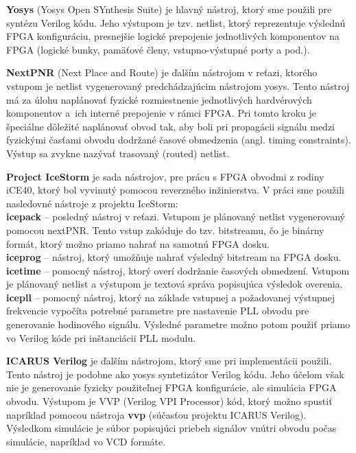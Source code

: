 \textbf{Yosys} (Yosys Open SYnthesis Suite) \cite{yosys} je hlavný nástroj, ktorý sme použili pre syntézu Verilog kódu. Jeho výstupom je tzv. netlist, ktorý reprezentuje výslednú FPGA konfiguráciu, presnejšie logické prepojenie jednotlivých komponentov na FPGA (logické bunky, pamäťové členy, vstupno-výstupné porty a pod.).

\textbf{NextPNR} (Next Place and Route) \cite{nextpnr} je ďalším nástrojom v reťazi, ktorého vstupom je netlist vygenerovaný predchádzajúcim nástrojom yosys. Tento nástroj má za úlohu naplánovať fyzické rozmiestnenie jednotlivých hardvérových komponentov a~ich interné prepojenie v rámci FPGA. Pri tomto kroku je špeciálne dôležité naplánovať obvod tak, aby boli pri propagácii signálu medzi fyzickými časťami obvodu dodržané časové obmedzenia (angl. timing constraints). Výstup sa zvykne nazývať trasovaný (routed) netlist.

\textbf{Project IceStorm} \cite{icestorm} je sada nástrojov, pre prácu s FPGA obvodmi z rodiny iCE40, ktorý bol vyvinutý pomocou reverzného inžinierstva. V práci sme použili nasledovné nástroje z projektu IceStorm:\\
\textbf{icepack} -- posledný nástroj v  reťazi. Vstupom je plánovaný netlist vygenerovaný pomocou nextPNR. Tento vstup zakóduje do tzv. bitstreamu, čo je binárny formát, ktorý možno priamo nahrať na samotnú FPGA dosku.\\
\textbf{iceprog} -- nástroj, ktorý umožňuje nahrať výsledný bitstream na FPGA dosku.\\
\textbf{icetime} -- pomocný nástroj, ktorý overí dodržanie časových obmedzení. Vstupom je plánovaný netlist a výstupom je textová správa popisujúca výsledok overenia.\\
\textbf{icepll} -- pomocný nástroj, ktorý na základe vstupnej a požadovanej výstupnej frekvencie vypočíta potrebné parametre pre nastavenie PLL obvodu pre generovanie hodinového signálu. Výsledné parametre možno potom použiť priamo vo Verilog kóde pri inštanciácii PLL modulu.

\textbf{ICARUS Verilog} \cite{iverilog} je ďalším nástrojom, ktorý sme pri implementácii použili. Tento nástroj je podobne ako yosys syntetizátor Verilog kódu. Jeho účelom však nie je generovanie fyzicky použiteľnej FPGA konfigurácie, ale simulácia FPGA obvodu. Výstupom je VVP (Verilog VPI Processor) kód, ktorý možno spustiť napríklad pomocou nástroja \textbf{vvp} (súčasťou projektu ICARUS Verilog). Výsledkom simulácie je súbor popisujúci priebeh signálov vnútri obvodu počas simulácie, napríklad vo VCD formáte.


